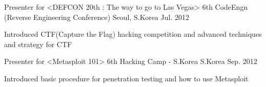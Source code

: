 \begin{cventries}
  \cventry
    {Presenter for <DEFCON 20th : The way to go to Las Vegas>}
    {6th CodeEngn (Reverse Engineering Conference)}
    {Seoul, S.Korea}
    {Jul. 2012}
    {
      \begin{cvitems}
        \item {Introduced CTF(Capture the Flag) hacking competition and advanced techniques and strategy for CTF}
      \end{cvitems}
    }
  \cventry
    {Presenter for <Metasploit 101>}
    {6th Hacking Camp - S.Korea}
    {S.Korea}
    {Sep. 2012}
    {
      \begin{cvitems}
        \item {Introduced basic procedure for penetration testing and how to use Metasploit}
      \end{cvitems}
    }
\end{cventries}

